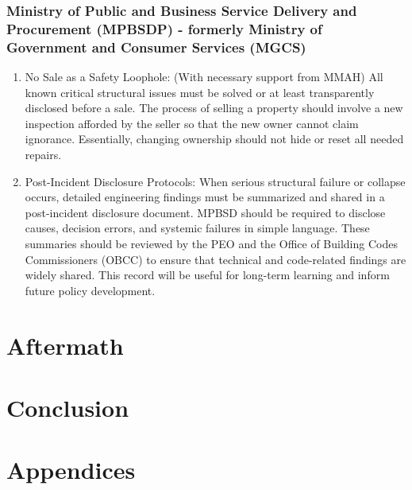 \documentclass[12pt]{article}
\begin{document}
\subsubsection{Ministry of Public and Business Service Delivery and Procurement (MPBSDP) - formerly Ministry of Government and Consumer Services (MGCS)}
\begin{enumerate}
    \item No Sale as a Safety Loophole: (With necessary support from MMAH) All known critical structural issues must be solved or at least transparently disclosed before a sale. The process of selling a property should involve a new inspection afforded by the seller so that the new owner cannot claim ignorance. Essentially, changing ownership should not hide or reset all needed repairs.

    \item Post-Incident Disclosure Protocols: When serious structural failure or collapse occurs, detailed engineering findings must be summarized and shared in a post-incident disclosure document. MPBSD should be required to disclose causes, decision errors, and systemic failures in simple language. These summaries should be reviewed by the PEO and the Office of Building Codes Commissioners (OBCC) to ensure that technical and code-related findings are widely shared. This record will be useful for long-term learning and inform future policy development.
\end{enumerate}




\section{Aftermath}

\section{Conclusion}


\section*{Appendices}

\newpage
\printbibliography
\end{document}
